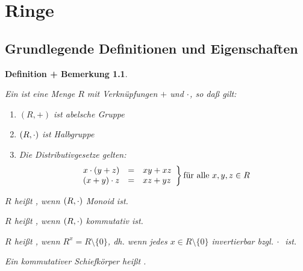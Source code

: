 \documentclass[a4paper,10pt,german]{scrbook}
\theoremstyle{saetze}
\theoremstyle{definitionen}
\newtheorem{DefBem}[Def]{Definition + Bemerkung}
\begin{document}
\chapter{Ringe}

\section{Grundlegende Definitionen und Eigenschaften}

\begin{DefBem}
\begin{enum}
\item Ein  ist eine Menge $R$ mit Verknüpfungen $+$ und
$\cdot$, so daß gilt:
\begin{enumerate}
\renewcommand{\labelenumii}{(\roman{enumii})}
\item $(R,+)$ ist abelsche Gruppe
\item $(R,\cdot)$ ist Halbgruppe
\item Die Distributivgesetze gelten:
\[ \left. \begin{array}{lcl}
    x\cdot(y+z) &=& xy + xz \\
    (x+y)\cdot z &=& xz + yz
    \end{array}
    \right\} \mbox{für alle }x,y,z \in R\]
\end{enumerate}

\item $R$ heißt , wenn $(R,\cdot)$ Monoid ist.
\item $R$ heißt , wenn $(R,\cdot)$ kommutativ
ist.
\item $R$ heißt , wenn $R^x = R \setminus \{0\}$,
dh. wenn jedes $x \in R \setminus \{0\}$ invertierbar bzgl. $\cdot\;$
ist.
\item Ein kommutativer Schiefkörper heißt .



\end{enum}
\end{DefBem}
\end{document}
